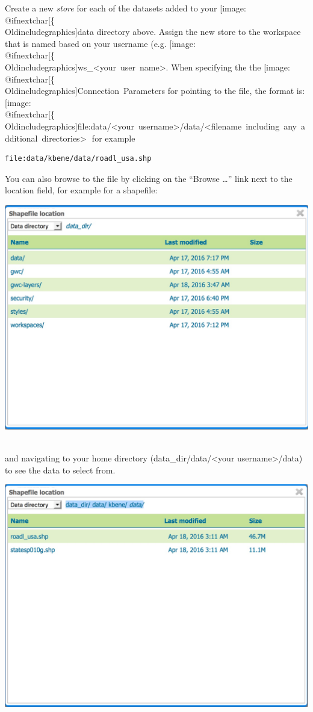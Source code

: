 \documentclass[]{book}
\makeatletter
\def\ScaleIfNeeded{%
  \ifdim\Gin@nat@width>.5\linewidth
    .5\linewidth
  \else
    \Gin@nat@width
  \fi
}
\let\Oldincludegraphics\texttt{[image: \%
 \\catcode`\\@=11\\relax\%
 \%\\gdef\\includegraphics\{\\@ifnextchar[\{\\Oldincludegraphics]}{\Oldincludegraphics[width=\ScaleIfNeeded]}}%
\gdef\texttt{[image: \\@ifnextchar[\{\\Oldincludegraphics]}{\Oldincludegraphics[max size={.75\textwidth}{.75\textheight}]}}%
\makeatother
\begin{document}
Create a new \emph{store} for each of the datasets added to your
\texttt{data} directory above. Assign the new store to the workspace
that is named based on your username (e.g.
\texttt{ws\_\textless{}your\ user\ name\textgreater{}}. When specifying
the the \texttt{Connection\ Parameters} for pointing to the file, the
format is:
\texttt{file:data/\textless{}your\ username\textgreater{}/data/\textless{}filename\ including\ any\ additional\ directories\textgreater{}} 
for example

\begin{verbatim}
file:data/kbene/data/roadl_usa.shp
\end{verbatim}

You can also browse to the file by clicking on the ``Browse \ldots{}''
link next to the location field, for example for a shapefile:

\includegraphics{images/GeoServer_Browse.jpg}~

and navigating to your home directory (data\_dir/data/\textless{}your
username\textgreater{}/data) to see the data to select from.

\includegraphics{images/GeoServer_SelectData.jpg}~
\end{document}
